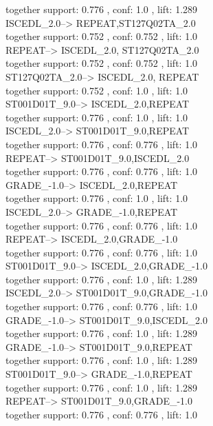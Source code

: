 \documentclass[12pt, a4paper, oneside]{ctexart}
\begin{document}
 together support: 0.776 , conf: 1.0 , lift: 1.289\\
ISCEDL\_2.0--> REPEAT,ST127Q02TA\_2.0\\
together support: 0.752 , conf: 0.752 , lift: 1.0\\
REPEAT--> ISCEDL\_2.0, ST127Q02TA\_2.0\\
together support: 0.752 , conf: 0.752 , lift: 1.0\\
ST127Q02TA\_2.0--> ISCEDL\_2.0, REPEAT\\
 together support: 0.752 , conf: 1.0 , lift: 1.0\\
ST001D01T\_9.0--> ISCEDL\_2.0,REPEAT\\
 together support: 0.776 , conf: 1.0 , lift: 1.0\\
ISCEDL\_2.0--> ST001D01T\_9.0,REPEAT\\
 together support: 0.776 , conf: 0.776 , lift: 1.0\\
REPEAT--> ST001D01T\_9.0,ISCEDL\_2.0\\
 together support: 0.776 , conf: 0.776 , lift: 1.0\\
GRADE\_-1.0--> ISCEDL\_2.0,REPEAT\\
 together support: 0.776 , conf: 1.0 , lift: 1.0\\
ISCEDL\_2.0--> GRADE\_-1.0,REPEAT\\
 together support: 0.776 , conf: 0.776 , lift: 1.0\\
REPEAT--> ISCEDL\_2.0,GRADE\_-1.0\\
 together support: 0.776 , conf: 0.776 , lift: 1.0\\
ST001D01T\_9.0--> ISCEDL\_2.0,GRADE\_-1.0\\
 together support: 0.776 , conf: 1.0 , lift: 1.289\\
ISCEDL\_2.0--> ST001D01T\_9.0,GRADE\_-1.0\\
 together support: 0.776 , conf: 0.776 , lift: 1.0\\
GRADE\_-1.0--> ST001D01T\_9.0,ISCEDL\_2.0\\
 together support: 0.776 , conf: 1.0 , lift: 1.289\\
GRADE\_-1.0--> ST001D01T\_9.0,REPEAT\\
 together support: 0.776 , conf: 1.0 , lift: 1.289\\
ST001D01T\_9.0--> GRADE\_-1.0,REPEAT\\
 together support: 0.776 , conf: 1.0 , lift: 1.289\\
REPEAT--> ST001D01T\_9.0,GRADE\_-1.0\\
 together support: 0.776 , conf: 0.776 , lift: 1.0\\
\end{document}
